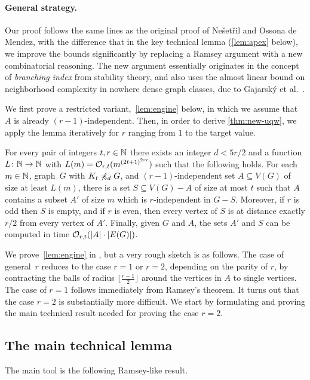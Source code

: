 \paragraph{General strategy.}
Our proof follows the same lines as the original proof of Ne\v set\v ril and Ossona de Mendez, with the difference that in the key technical lemma (\cref{lem:apex} below), 
we improve the bounds significantly by replacing a Ramsey argument with a new combinatorial reasoning.
The new argument essentially originates in the concept of {\em{branching index}} from stability theory, 
and also uses the almost linear bound on neighborhood complexity in nowhere dense graph classes, due to Gajarsk\'y et al.~\cite{gajarsky2017kernelization}.

We first prove a restricted variant,~\cref{lem:engine} below, in which we assume that $A$ is already $(r-1)$-independent. Then, in order to derive
\cref{thm:new-uqw}, we apply the lemma iteratively for $r$ ranging from $1$ to the target value.

\begin{lemma}\label{lem:engine}
For every pair of integers $t,r\in \mathbb{N}$ there exists an integer $d<5r/2$ and a function $L\colon \mathbb{N}\to \mathbb{N}$ with $L(m)=\mathcal{O}_{r,t}{(m^{{(2t+1)}^{2rt}})}$ such that the following holds.
For each $m\in \mathbb{N}$, graph~$G$ with $K_t\not\preccurlyeq_{d} G$, and
$(r-1)$-independent set $A\subseteq V(G)$ of size at least $L(m)$, there is a set $S\subseteq V(G)-A$ of size at most $t$ such that $A$ contains a subset $A'$ of size $m$ which is $r$-independent in $G-S$.
Moreover, if $r$ is odd then $S$ is empty, and if $r$ is even,
then every vertex of $S$ is at distance exactly $r/2$ from every vertex of $A'$.
Finally, given $G$ and $A$, the sets $A'$ and $S$ can be computed in time $\mathcal{O}_{r,t}(|A|\cdot |E(G)|)$.
\end{lemma}

We prove~\cref{lem:engine} in , but  a very rough sketch is as follows.
The  case of general~$r$ reduces to the case $r=1$ or $r=2$, depending on the parity of $r$,
by contracting the balls of radius $\lfloor \frac {r-1} 2\rfloor $ around the vertices in $A$ to single vertices.
The case of $r=1$ follows immediately from Ramsey's theorem. 
It turns out that the case $r=2$ is substantially more difficult.
We start by formulating and proving the main technical result needed for proving the case $r=2$.

\subsection{The main technical lemma}
The main tool is the following Ramsey-like result.

